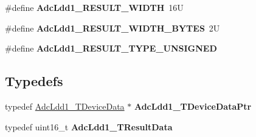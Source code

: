 \begin{DoxyCompactItemize}
\item 
\mbox{\label{group___adc_ldd1__module_ga84f18908164f6c6b8b8ccefa8b01c87b}} 
\#define {\bfseries Adc\+Ldd1\+\_\+\+R\+E\+S\+U\+L\+T\+\_\+\+W\+I\+D\+TH}~16U
\item 
\mbox{\label{group___adc_ldd1__module_gabe7f6957bdc1b4d8a3cb7df4f0e50a88}} 
\#define {\bfseries Adc\+Ldd1\+\_\+\+R\+E\+S\+U\+L\+T\+\_\+\+W\+I\+D\+T\+H\+\_\+\+B\+Y\+T\+ES}~2U
\item 
\mbox{\label{group___adc_ldd1__module_ga57f9b5507ee5e9a1d531867951d1ded9}} 
\#define {\bfseries Adc\+Ldd1\+\_\+\+R\+E\+S\+U\+L\+T\+\_\+\+T\+Y\+P\+E\+\_\+\+U\+N\+S\+I\+G\+N\+ED}
\end{DoxyCompactItemize}
\subsection*{Typedefs}
\begin{DoxyCompactItemize}
\item 
\mbox{\label{group___adc_ldd1__module_gabc048953ad953bc16463d49d94832206}} 
typedef \hyperlink{struct_adc_ldd1___t_device_data}{Adc\+Ldd1\+\_\+\+T\+Device\+Data} $\ast$ {\bfseries Adc\+Ldd1\+\_\+\+T\+Device\+Data\+Ptr}
\item 
\mbox{\label{group___adc_ldd1__module_ga8eae0d930b3aef7c47506b32a22e4f12}} 
typedef uint16\+\_\+t {\bfseries Adc\+Ldd1\+\_\+\+T\+Result\+Data}
\end{DoxyCompactItemize}
